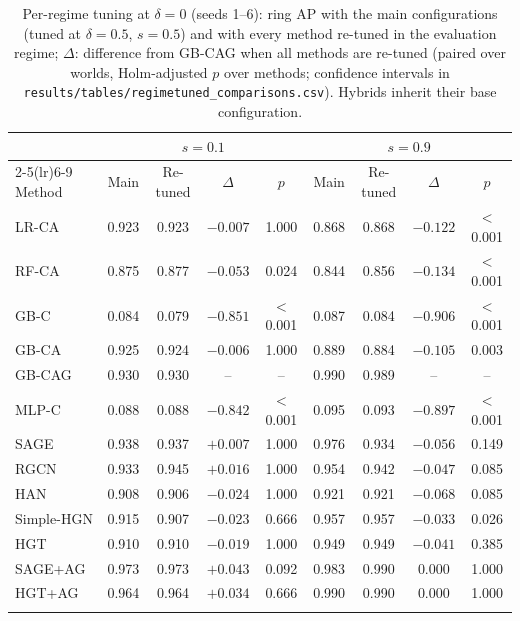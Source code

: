 \begin{table}[h]
\caption{Per-regime tuning at $\delta=0$ (seeds 1--6): ring AP with the main configurations (tuned at $\delta=0.5$, $s=0.5$) and with every method re-tuned in the evaluation regime; $\Delta$: difference from GB-CAG when all methods are re-tuned (paired over worlds, Holm-adjusted $p$ over methods; confidence intervals in \texttt{results/tables/regimetuned\_comparisons.csv}). Hybrids inherit their base configuration.}\label{tab:regimetuned}
\scriptsize
\setlength{\tabcolsep}{4pt}
\begin{tabular}{@{}lcccccccc@{}}
\toprule
 & \multicolumn{4}{c}{$s=0.1$} & \multicolumn{4}{c}{$s=0.9$} \\
\cmidrule(lr){2-5}\cmidrule(lr){6-9}
Method & Main & Re-tuned & $\Delta$ & $p$ & Main & Re-tuned & $\Delta$ & $p$ \\
\midrule
LR-CA & 0.923 & 0.923 & $-0.007$ & 1.000 & 0.868 & 0.868 & $-0.122$ & $<$0.001 \\
RF-CA & 0.875 & 0.877 & $-0.053$ & 0.024 & 0.844 & 0.856 & $-0.134$ & $<$0.001 \\
GB-C & 0.084 & 0.079 & $-0.851$ & $<$0.001 & 0.087 & 0.084 & $-0.906$ & $<$0.001 \\
GB-CA & 0.925 & 0.924 & $-0.006$ & 1.000 & 0.889 & 0.884 & $-0.105$ & 0.003 \\
GB-CAG & 0.930 & 0.930 & -- & -- & 0.990 & 0.989 & -- & -- \\
MLP-C & 0.088 & 0.088 & $-0.842$ & $<$0.001 & 0.095 & 0.093 & $-0.897$ & $<$0.001 \\
SAGE & 0.938 & 0.937 & $+0.007$ & 1.000 & 0.976 & 0.934 & $-0.056$ & 0.149 \\
RGCN & 0.933 & 0.945 & $+0.016$ & 1.000 & 0.954 & 0.942 & $-0.047$ & 0.085 \\
HAN & 0.908 & 0.906 & $-0.024$ & 1.000 & 0.921 & 0.921 & $-0.068$ & 0.085 \\
Simple-HGN & 0.915 & 0.907 & $-0.023$ & 0.666 & 0.957 & 0.957 & $-0.033$ & 0.026 \\
HGT & 0.910 & 0.910 & $-0.019$ & 1.000 & 0.949 & 0.949 & $-0.041$ & 0.385 \\
SAGE+AG & 0.973 & 0.973 & $+0.043$ & 0.092 & 0.983 & 0.990 & $0.000$ & 1.000 \\
HGT+AG & 0.964 & 0.964 & $+0.034$ & 0.666 & 0.990 & 0.990 & $0.000$ & 1.000 \\
\botrule
\end{tabular}
\end{table}